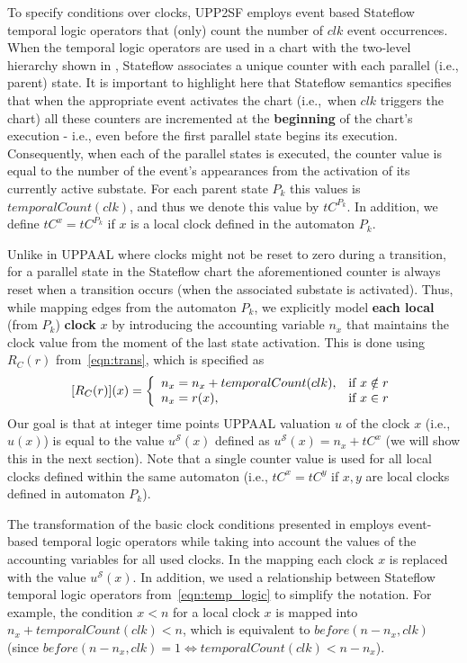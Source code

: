 To specify conditions over clocks, UPP2SF employs event based Stateflow temporal logic operators that (only) count the number of $clk$ event occurrences. When the temporal logic operators are used in a chart with the two-level hierarchy shown in , Stateflow associates a unique counter with each parallel (i.e., parent) state. It is important to highlight here that Stateflow semantics specifies that when the appropriate event activates the chart (i.e.,~when $clk$ triggers the chart) all these counters are incremented at the \textbf{beginning} of the chart's execution - i.e., even before the first parallel state begins its execution. Consequently, when each of the parallel states is executed, the counter value is equal to the number of the event's appearances from the activation of its currently active substate. For each parent state $P_k$ this values is $temporalCount(clk)$, and thus we denote this value by $tC^{P_k}$. In addition, we define $tC^x=tC^{P_k}$ if $x$ is a local clock defined in the automaton $P_k$.

Unlike in UPPAAL where clocks might not be reset to zero during a transition, for a parallel state in the Stateflow chart the aforementioned counter is always reset when a transition occurs (when the associated substate is activated). Thus, while mapping edges from the automaton $P_k$, we explicitly model \textbf{each local} (from $P_k$) \textbf{clock} $x$ by introducing the accounting variable $n_x$ that maintains the clock value from the moment of the last state activation. This is done using $R_{C}(r)$ from~\eqref{eqn:trans}, which is specified as
\begin{equation}
\label{eqn:lclock_res}
[R_{C}(r)](x) = \left\{
\begin{array}{lr} 
n_x=n_x+temporalCount(clk), & \hbox{if } x\notin r\\
n_x = r(x),& \hbox{if } x\in r
\end{array}
\right.
\end{equation}
Our goal is that at integer time points UPPAAL valuation $u$ of the clock $x$ (i.e.,~$u(x)$) is equal to the value 
$u^\mathcal{S}(x)$ defined as 
$
\label{eqn:us_def}
u^\mathcal{S}(x)=n_x+tC^x
$ 
(we will show this in the next section). Note that a single counter value is used for all local clocks defined within the same automaton (i.e., $tC^x=tC^y$ if $x,y$ are local clocks defined in automaton $P_k$). 


The transformation of the basic clock conditions presented in  employs event-based temporal logic operators while taking into account the values of the accounting variables for all used clocks. In the mapping each clock $x$ is replaced with the value $u^\mathcal{S}(x)$. In addition, we used a relationship between Stateflow temporal logic operators from~\eqref{eqn:temp_logic} to simplify the notation. For example, the condition $x<n$ for a local clock $x$ is mapped into $n_x+temporalCount(clk)<n$, which is equivalent to $before(n-n_x,clk)$ (since $before(n-n_x,clk)=1\Leftrightarrow temporalCount(clk)< n-n_x$).


